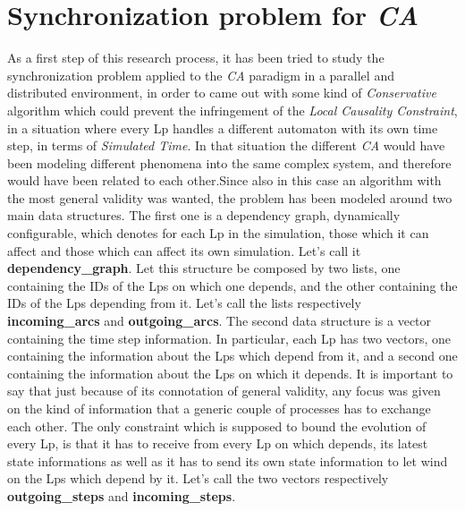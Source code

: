 \documentclass[12pt,a4paper,fleqn]{report}
\begin{document}
\section{Synchronization problem for \textit{CA}}
As a first step of this research process, it has been tried to study the synchronization problem applied to the \textit{CA} paradigm in a parallel and distributed environment, in order to came out with some kind of \textit{Conservative} algorithm which could prevent the infringement of the \textit{Local Causality Constraint}, in a situation where every Lp handles a different automaton with its own time step, in terms of \textit{Simulated Time}. In that situation the different \textit{CA} would have been modeling different phenomena into the same complex system, and therefore would have been related to each other.\singlespacing Since also in this case an algorithm with the most general validity was wanted, the problem has been modeled around two main data structures. The first one is a dependency graph, dynamically configurable, which denotes for each Lp in the simulation, those which it can affect and those which can affect its own simulation. Let's call it \textbf{dependency\_graph}. Let this structure be composed by two lists, one containing the IDs of the Lps on which one depends, and the other containing the IDs of the Lps depending from it. Let's call the lists respectively \textbf{incoming\_arcs} and \textbf{outgoing\_arcs}. The second data structure is a vector containing the time step information. In particular, each Lp has two vectors, one containing the information about the Lps which depend from it, and a second one containing the information about the Lps on which it depends. It is important to say that just because of its connotation of general validity, any focus was given on the kind of information that a generic couple of processes has to exchange each other. The only constraint which is supposed to bound the evolution of every Lp, is that it has to receive from every Lp on which depends, its latest state informations as well as it has to send its own state information to let wind on the Lps which depend by it. Let's call the two vectors respectively \textbf{outgoing\_steps} and \textbf{incoming\_steps}.\\
\end{document}
